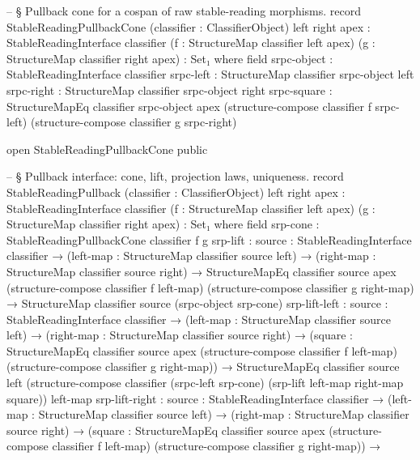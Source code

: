 \documentclass[11pt]{article}
\begin{document}
\begin{code}
-- § Pullback cone for a cospan of raw stable-reading morphisms.
record StableReadingPullbackCone
  (classifier : ClassifierObject)
  {left right apex : StableReadingInterface classifier}
  (f : StructureMap classifier left apex)
  (g : StructureMap classifier right apex) : Set₁ where
  field
    srpc-object : StableReadingInterface classifier
    srpc-left   : StructureMap classifier srpc-object left
    srpc-right  : StructureMap classifier srpc-object right
    srpc-square : StructureMapEq classifier srpc-object apex
      (structure-compose classifier f srpc-left)
      (structure-compose classifier g srpc-right)

open StableReadingPullbackCone public

-- § Pullback interface: cone, lift, projection laws, uniqueness.
record StableReadingPullback
  (classifier : ClassifierObject)
  {left right apex : StableReadingInterface classifier}
  (f : StructureMap classifier left apex)
  (g : StructureMap classifier right apex) : Set₁ where
  field
    srp-cone : StableReadingPullbackCone classifier f g
    srp-lift : {source : StableReadingInterface classifier} →
               (left-map : StructureMap classifier source left) →
               (right-map : StructureMap classifier source right) →
               StructureMapEq classifier source apex
                 (structure-compose classifier f left-map)
                 (structure-compose classifier g right-map) →
               StructureMap classifier source (srpc-object srp-cone)
    srp-lift-left : {source : StableReadingInterface classifier} →
                    (left-map : StructureMap classifier source left) →
                    (right-map : StructureMap classifier source right) →
                    (square : StructureMapEq classifier source apex
                      (structure-compose classifier f left-map)
                      (structure-compose classifier g right-map)) →
                    StructureMapEq classifier source left
                      (structure-compose classifier (srpc-left srp-cone)
                        (srp-lift left-map right-map square))
                      left-map
    srp-lift-right : {source : StableReadingInterface classifier} →
                     (left-map : StructureMap classifier source left) →
                     (right-map : StructureMap classifier source right) →
                     (square : StructureMapEq classifier source apex
                       (structure-compose classifier f left-map)
                       (structure-compose classifier g right-map)) →

\end{code}
\end{document}

